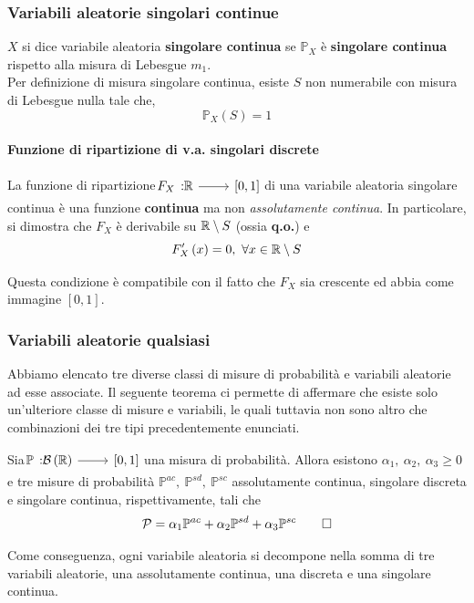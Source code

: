 \subsubsection{Variabili aleatorie singolari continue}
\begin{define}
	$X$ si dice variabile aleatoria \textbf{singolare continua} se $\mathbb{P}_X$ è \textbf{singolare continua} rispetto alla misura di Lebesgue $m_1$.\\
	Per definizione di misura singolare continua, esiste $S$ non numerabile con misura di Lebesgue nulla tale che,
	\begin{equation}
		\mathbb{P}_X\left(S\right)=1
	\end{equation}
\end{define}
\paragraph{Funzione di ripartizione di v.a. singolari discrete}
La funzione di ripartizione $\funz{F_X}{\realset}{\left[0,1\right]}$ di una variabile aleatoria singolare continua è una funzione \textbf{continua} ma non \textit{assolutamente continua}.%
In particolare, si dimostra che $F_X$ è derivabile su $\mathbb{R}\setminus S$ (ossia \textbf{q.o.}) e
\begin{equation}
F'_X\left(x\right)=0,\ \forall x\in\mathbb{R}\setminus S
\end{equation}
\begin{observe}
	Questa condizione è compatibile con il fatto che $F_X$ sia crescente ed abbia come immagine $\left[0,1\right]$.
\end{observe}
\begin{examplewt}
\end{examplewt}
\subsubsection{Variabili aleatorie qualsiasi}
Abbiamo elencato tre diverse classi di misure di probabilità e variabili aleatorie ad esse associate. Il seguente teorema ci permette di affermare che esiste solo un'ulteriore classe di misure e variabili, le quali tuttavia non sono altro che combinazioni dei tre tipi precedentemente enunciati. 
\begin{theoremaqed}
	Sia $\funz{\mathbb{P}}{\mathcal{B}\left(\realset\right)}{\left[0,1\right]}$ una misura di probabilità. Allora esistono $\alpha_1,\ \alpha_2,\ \alpha_3\geq 0$ e tre misure di probabilità $\mathbb{P}^{ac},\ \mathbb{P}^{sd},\ \mathbb{P}^{sc}$ assolutamente continua, singolare discreta e singolare continua, rispettivamente, tali che
	\begin{equation}
		\mathcal{P}=\alpha_1\mathbb{P}^{ac}+\alpha_2\mathbb{P}^{sd}+\alpha_3\mathbb{P}^{sc}\qedhere
	\end{equation}
\end{theoremaqed}
Come conseguenza, ogni variabile aleatoria si decompone nella somma di tre variabili aleatorie, una assolutamente continua, una discreta e una singolare continua.

